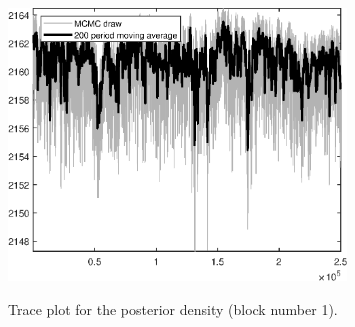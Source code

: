 \begin{figure}[H]
\centering
  \includegraphics[width=0.8\textwidth]{BRS_comovement/graphs/TracePlot_Posterior_blck_1}\\
    \caption{Trace plot for the posterior density (block number 1).}
\end{figure}
